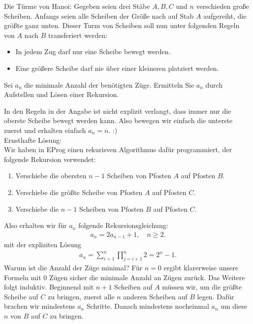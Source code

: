 \begin{exercise}
Die Türme von Hanoi: Gegeben seien drei Stäbe $A,B,C$ und $n$ verschieden große
Scheiben. Anfangs seien alle Scheiben der Größe nach auf Stab $A$ aufgereiht, die
größte ganz unten. Dieser Turm von Scheiben soll nun unter folgenden Regeln von
$A$ nach $B$ transferiert werden:
\begin{itemize}
  \item In jedem Zug darf nur eine Scheibe bewegt werden.
  \item Eine größere Scheibe darf nie über einer kleineren platziert werden.
\end{itemize}
Sei $a_n$ die minimale Anzahl der benötigten Züge. Ermitteln Sie $a_n$ durch
Aufstellen und Lösen einer Rekursion.
\end{exercise}


\begin{solution}
In den Regeln in der Angabe ist nicht explizit verlangt, dass immer nur die
oberste Scheibe bewegt werden kann. Also bewegen wir einfach die unterste
zuerst und erhalten einfach $a_n = n$. :) \\
Ernsthafte Lösung: \\
Wir haben in EProg einen rekurisven Algorithmus dafür programmiert, der
folgende Rekursion verwendet:
\begin{enumerate}
  \item Verschiebe die obersten $n-1$ Scheiben von Pfosten $A$ auf Pfosten $B$.
  \item Verschiebe die größte Scheibe von Pfosten $A$ auf Pfosten $C$.
  \item Verschiebe die $n-1$ Scheiben von Pfosten $B$ auf Pfosten $C$.
\end{enumerate}
Also erhalten wir für $a_n$ folgende Rekursionsgleichung:
\begin{align*}
  a_n = 2a_{n-1} + 1, \quad n \geq 2.
\end{align*}
mit der expliziten Lösung
\begin{align*}
  a_n = \sum_{i=1}^n\prod_{j=i+1}^n2 = 2^n - 1.
\end{align*}
Warum ist die Anzahl der Züge minimal? Für $n = 0$ ergibt klarerweise unsere Formeln mit $0$ Zügen sicher die minimale Anzahl an Zügen zurück. Das Weitere folgt induktiv. Beginnend mit $n + 1$ Scheiben auf $A$ müssen wir, um die größte Scheibe auf $C$ zu bringen, zuerst alle $n$ anderen Scheiben auf $B$ legen. Dafür brachen wir mindestens $a_n$ Schritte. Danach mindestens nocheinmal $a_n$ um diese $n$ von $B$ auf $C$ zu bringen.
\end{solution}

